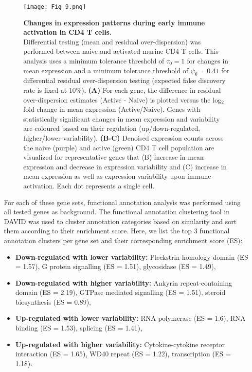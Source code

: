 \newpage

\begin{figure}[!h]
\centering
\texttt{[image: Fig\_9.png]}
\caption[Changes in expression patterns during early immune activation]{\textbf{Changes in expression patterns during early immune activation in CD4\plus{} T cells.}\\
Differential testing (mean and residual over-dispersion) was performed between naive and activated murine CD4\plus{} T cells. This analysis uses a minimum tolerance threshold of $\tau_0=1$ for changes in mean expression and a minimum tolerance threshold of $\psi_0=0.41$ for differential residual over-dispersion testing (expected false discovery rate is fixed at 10\%). \textbf{(A)} For each gene, the difference in residual over-dispersion estimates (Active - Naive) is plotted versus the log$_2$ fold change in mean expression (Active/Naive). Genes with statistically significant changes in mean expression and variability are coloured based on their regulation (up/down-regulated, higher/lower variability).  \textbf{(B-C)} Denoised expression counts across the naive (purple) and active (green) CD4\plus{} T cell population are visualized for representative genes that (B) increase in mean expression and decrease in expression variability and (C) increase in mean expression as well as expression variability  upon immune activation. Each dot represents a single cell.}
\label{fig2:immune_activation}
\end{figure}

\newpage

For each of these gene sets, functional annotation analysis was performed using all tested genes as background. The functional annotation clustering tool in DAVID \citep{Dennis2003} was used to cluster annotation categories based on similarity and sort them according to their enrichment score. Here, we  list the top 3 functional annotation clusters per gene set and their corresponding enrichment score (ES):
\begin{itemize}
\item \textbf{Down-regulated with lower variability:} Pleckstrin homology domain (ES = 1.57), G protein signalling (ES = 1.51), glycosidase (ES = 1.49),
\item \textbf{Down-regulated with higher variability:} Ankyrin repeat-containing domain (ES = 2.19), GTPase mediated signalling (ES = 1.51), steroid biosynthesis (ES = 0.89), 
\item \textbf{Up-regulated with lower variability:} RNA polymerase (ES = 1.6), RNA binding (ES = 1.53), splicing (ES = 1.41),
\item \textbf{Up-regulated with higher variability:} Cytokine-cytokine receptor interaction (ES = 1.65), WD40 repeat (ES = 1.22), transcription (ES = 1.18).
\end{itemize}

